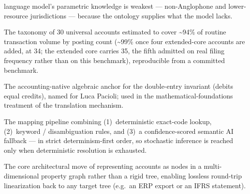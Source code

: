 \begin{description}
    language model's parametric knowledge is weakest --- non-Anglophone and
    lower-resource jurisdictions --- because the ontology supplies what the model
    lacks.
  \item[Level 3 Minimum Core] The taxonomy of 30 universal accounts estimated to
    cover \textasciitilde94\% of routine transaction volume by posting count
    (\textasciitilde99\% once four extended-core accounts are added, at 34; the
    extended core carries 35, the fifth admitted on real filing frequency rather
    than on this benchmark), reproducible from a
    committed benchmark.
  \item[Pacioli Group] The accounting-native algebraic anchor for the
    double-entry invariant (debits equal credits), named for Luca Pacioli; used in
    the mathematical-foundations treatment of the translation mechanism.
  \item[Three-Tier Resolution Strategy\textsuperscript{\dag}] The mapping
    pipeline combining (1)~deterministic exact-code lookup, (2)~keyword /
    disambiguation rules, and (3)~a confidence-scored semantic AI fallback ---
    in strict determinism-first order, so stochastic inference is reached only
    when deterministic resolution is exhausted.
  \item[Tree-to-Graph Universal Bridge\textsuperscript{\dag}] The core
    architectural move of representing accounts as nodes in a multi-dimensional
    property graph rather than a rigid tree, enabling lossless round-trip
    linearization back to any target tree (e.g.\ an ERP export or an IFRS
    statement).
\end{description}
